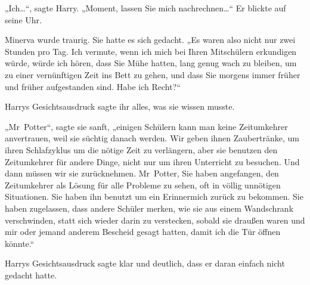 „Ich…“, sagte Harry. „Moment, lassen Sie mich nachrechnen…“ Er blickte auf seine Uhr.

Minerva wurde traurig. Sie hatte es sich gedacht. „Es waren also nicht nur zwei Stunden pro Tag. Ich vermute, wenn ich mich bei Ihren Mitschülern erkundigen würde, würde ich hören, dass Sie Mühe hatten, lang genug wach zu bleiben, um zu einer vernünftigen Zeit ins Bett zu gehen, und dass Sie morgens immer früher und früher aufgestanden sind. Habe ich Recht?“

Harrys Gesichtsausdruck sagte ihr alles, was sie wissen musste.

„Mr~Potter“, sagte sie sanft, „einigen Schülern kann man keine Zeitumkehrer anvertrauen, weil sie süchtig danach werden. Wir geben ihnen Zaubertränke, um ihren Schlafzyklus um die nötige Zeit zu verlängern, aber sie benutzen den Zeitumkehrer für andere Dinge, nicht nur um ihren Unterricht zu besuchen. Und dann müssen wir sie zurücknehmen. Mr~Potter, Sie haben angefangen, den Zeitumkehrer als Lösung für alle Probleme zu sehen, oft in völlig unnötigen Situationen. Sie haben ihn benutzt um ein Erinnermich zurück zu bekommen. Sie haben zugelassen, dass andere Schüler merken, wie sie aus einem Wandschrank verschwinden, statt sich wieder darin zu verstecken, sobald sie draußen waren und mir oder jemand anderem Bescheid gesagt hatten, damit ich die Tür öffnen könnte.“

Harrys Gesichtsausdruck sagte klar und deutlich, dass er daran einfach nicht gedacht hatte.

